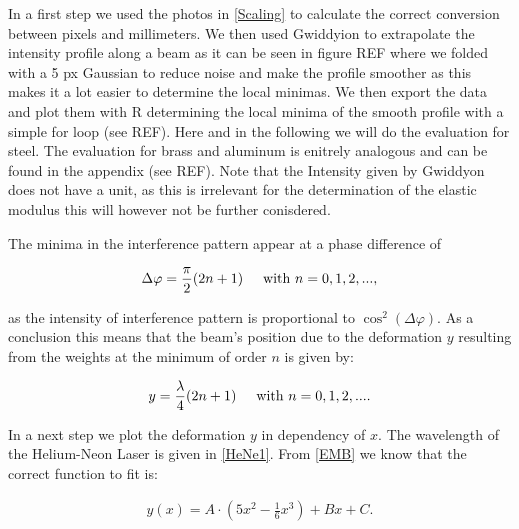
In a first step we used the photos in \ref{Scaling} to calculate the correct conversion between pixels and millimeters. We then used Gwiddyion to extrapolate the intensity profile along a beam as it can be seen in figure REF where we folded with a 5 px Gaussian to reduce noise and make the profile smoother as this makes it a lot easier to determine the local minimas. We then export the data and plot them with R determining the local minima of the smooth profile with a simple for loop (see REF).  Here and in the following we will do the evaluation for steel. The evaluation for brass and aluminum is enitrely analogous and can be found in the appendix (see REF). Note that the Intensity given by Gwiddyon does not have a unit, as this is irrelevant for the determination of the elastic modulus this will however not be further conisdered.


The minima in the interference pattern appear at a phase difference of

\begin{align*}
\Delta \varphi=\frac{\pi}{2}(2n+1)\hspace{0.5cm}\mbox{with }n=0,1,2,...,
\end{align*}

as the intensity of interference pattern is proportional to $\cos^2(\Delta\varphi)$. As a conclusion this means that the beam's position due to the deformation $y$ resulting from the weights at the minimum of order $n$ is given by:

\begin{align*}
y=\frac{\lambda}{4}(2n+1)\hspace{0.5cm}\mbox{with }n=0,1,2,... .
\end{align*}

In a next step we plot the deformation $y$ in dependency of $x$. The wavelength of the Helium-Neon Laser is given in \ref{HeNe1}. From \ref{EMB} we know that the correct function to fit is:

\begin{align*}
y(x)=A\cdot\left(5x^2-\frac{1}{6}x^3\right)+Bx+C .
\end{align*}  

